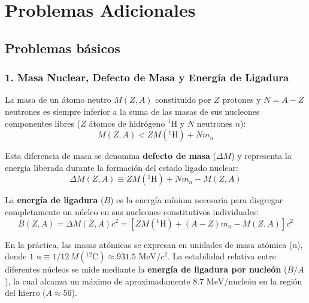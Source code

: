 
\chapter{Problemas Adicionales}
\label{chap:problemas_adicionales}


\section{Problemas básicos}

\subsection*{1. Masa Nuclear, Defecto de Masa y Energía de Ligadura}

La masa de un átomo neutro $M(Z,A)$ constituido por $Z$ protones y $N = A - Z$ neutrones es siempre inferior a la suma de las masas de sus nucleones componentes libres ($Z$ átomos de hidrógeno ${}^1\text{H}$ y $N$ neutrones $n$):
\begin{equation}
M(Z,A) < Z M({}^1\text{H}) + N m_n
\end{equation}

Esta diferencia de masa se denomina \textbf{defecto de masa} ($\Delta M$) y representa la energía liberada durante la formación del estado ligado nuclear:
\begin{equation}
\Delta M(Z,A) \equiv Z M({}^1\text{H}) + N m_n - M(Z,A)
\end{equation}

La \textbf{energía de ligadura} ($B$) es la energía mínima necesaria para disgregar completamente un núcleo en sus nucleones constitutivos individuales:
\begin{equation}
B(Z,A) = \Delta M(Z,A) c^2 = \left[ Z M({}^1\text{H}) + (A - Z) m_n - M(Z,A) \right] c^2
\end{equation}

En la práctica, las masas atómicas se expresan en unidades de masa atómica ($\text{u}$), donde $1\text{ u} \equiv 1/12 \, M({}^{12}\text{C}) \approx 931.5\text{ MeV}/c^2$. La estabilidad relativa entre diferentes núcleos se mide mediante la \textbf{energía de ligadura por nucleón} ($B/A$), la cual alcanza un máximo de aproximadamente $8.7\text{ MeV/nucleón}$ en la región del hierro ($A \approx 56$).

